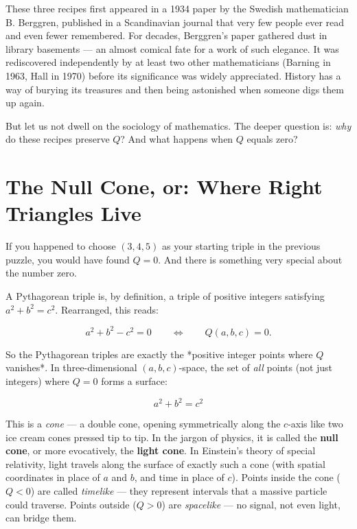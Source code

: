 These three recipes first appeared in a 1934 paper by the Swedish mathematician B. Berggren, published in a Scandinavian journal that very few people ever read and even fewer remembered. For decades, Berggren's paper gathered dust in library basements --- an almost comical fate for a work of such elegance. It was rediscovered independently by at least two other mathematicians (Barning in 1963, Hall in 1970) before its significance was widely appreciated. History has a way of burying its treasures and then being astonished when someone digs them up again.

But let us not dwell on the sociology of mathematics. The deeper question is: \textit{why} do these recipes preserve $Q$? And what happens when $Q$ equals zero?


\ornbreak



\section{The Null Cone, or: Where Right Triangles Live}


If you happened to choose $(3, 4, 5)$ as your starting triple in the previous puzzle, you would have found $Q = 0$. And there is something very special about the number zero.

A Pythagorean triple is, by definition, a triple of positive integers satisfying $a^2 + b^2 = c^2$. Rearranged, this reads:

\[
a^2 + b^2 - c^2 = 0 \qquad\Longleftrightarrow\qquad Q(a, b, c) = 0.
\]

So the Pythagorean triples are exactly the *positive integer points where $Q$ vanishes*. In three-dimensional $(a, b, c)$-space, the set of \textit{all} points (not just integers) where $Q = 0$ forms a surface:

\[
a^2 + b^2 = c^2
\]

This is a \textit{cone} --- a double cone, opening symmetrically along the $c$-axis like two ice cream cones pressed tip to tip. In the jargon of physics, it is called the \textbf{null cone}, or more evocatively, the \textbf{light cone}. In Einstein's theory of special relativity, light travels along the surface of exactly such a cone (with spatial coordinates in place of $a$ and $b$, and time in place of $c$). Points inside the cone ($Q < 0$) are called \textit{timelike} --- they represent intervals that a massive particle could traverse. Points outside ($Q > 0$) are \textit{spacelike} --- no signal, not even light, can bridge them.

